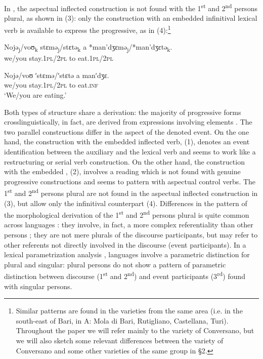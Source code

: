 \documentclass[output=paper]{langsci/langscibook}
\begin{document}
In , the aspectual inflected construction is not found with the 1\textsuperscript{st} and 2\textsuperscript{nd} persons plural, as shown in (3): only the construction with an embedded infinitival lexical verb is available to express the progressive, as in (4):\footnote{Similar patterns are found in the varieties from the same area (i.e. in the south-east of Bari, in A: Mola di Bari, Rutigliano, Castellana, Turi). Throughout the paper we will refer mainly to the variety of Conversano, but we will also sketch some relevant differences between the variety of Conversano and some other varieties of the same group in §2.}\largerpage[-4]

\ea%
    \label{ex:lorusso:3}
    \gll Nojə\textsubscript{j}/voʊ\textsubscript{k}   stɛmə\textsubscript{j}/stɛtə\textsubscript{k}   a   *man’dʒɛmə\textsubscript{j}/*man’dʒɛtə\textsubscript{k}.\\
         we/you  stay.\textsc{1pl}/\textsc{2pl} to   eat.\textsc{1pl}/\textsc{2pl} \\
    \z


\ea%
    \label{ex:lorusso:4}
    \gll Nojə/voʊ   ʹstɛmə/ʹstɛtə   a  manʹdʒɛ.\\
         we/you   stay.\textsc{1pl}/\textsc{2pl} to   eat.\textsc{inf}\\
    \glt ‘We/you are eating.’
    \z


Both types of structure share a  derivation: the majority of progressive forms crosslinguistically, in fact, are derived from expressions involving  elements  \citep{Bybee1994,Mateu1999,Laka2006}. The two parallel constructions differ in the aspect of the denoted event. On the one hand, the construction with the embedded inflected verb, (1), denotes an event identification between the auxiliary and the lexical verb and seems to work like a restructuring or serial verb construction. On the other hand, the construction with the embedded , (2), involves a  reading which is not found with genuine progressive constructions \citep{Chierchia1995} and seems to pattern with aspectual control verbs. The 1\textsuperscript{st} and 2\textsuperscript{nd} persons plural are not found in the aspectual inflected construction in (3), but allow only the infinitival counterpart (4). Differences in the pattern of the morphological derivation of the 1\textsuperscript{st} and 2\textsuperscript{nd} persons plural is quite common across  languages \citep{Manzini2005,Manzini2011Bio}: they involve, in fact, a more complex referentiality than other persons \citep{Bobaljik2008Missing}; they are not mere plurals of the discourse participants, but may refer to other referents not directly involved in the discourse (event participants). In a lexical parametrization analysis \citep{Manzini2011Bio}, languages involve a parametric distinction for plural and singular: plural persons do not show a pattern of parametric distinction between discourse (1\textsuperscript{st} and 2\textsuperscript{nd}) and event participants (3\textsuperscript{rd}) found with singular persons. 
\end{document}
